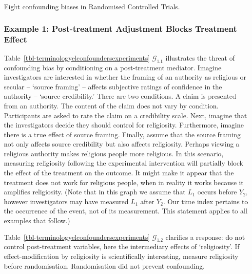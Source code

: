 \documentclass[
  single column]{article}
\begin{document}
\begin{table}

\caption{\label{tbl-terminologyelconfoundersexperiments}Eight
confounding biases in Randomised Controlled Trials.}

\centering{

\terminologyelconfoundersexperiments

}

\end{table}%

\subsubsection{Example 1: Post-treatment Adjustment Blocks Treatment
Effect}\label{example-1-post-treatment-adjustment-blocks-treatment-effect}

Table~\ref{tbl-terminologyelconfoundersexperiments}
\(\mathcal{G}_{1.1}\) illustrates the threat of confounding bias by
conditioning on a post-treatment mediator. Imagine investigators are
interested in whether the framing of an authority as religious or
secular -- `source framing' -- affects subjective ratings of confidence
in the authority -- `source credibility.' There are two conditions. A
claim is presented from an authority. The content of the claim does not
vary by condition. Participants are asked to rate the claim on a
credibility scale. Next, imagine that the investigators decide they
should control for religiosity. Furthermore, imagine there is a true
effect of source framing. Finally, assume that the source framing not
only affects source credibility but also affects religiosity. Perhaps
viewing a religious authority makes religious people more religious. In
this scenario, measuring religiosity following the experimental
intervention will partially block the effect of the treatment on the
outcome. It might make it appear that the treatment does not work for
religious people, when in reality it works because it amplifies
religiosity. (Note that in this graph we assume that \(L_1\) occurs
before \(Y_2\), however investigators may have measured \(L_1\) after
\(Y_2\). Our time index pertains to the occurrence of the event, not of
its measurement. This statement applies to all examples that follow.)

Table~\ref{tbl-terminologyelconfoundersexperiments}
\(\mathcal{G}_{1.2}\) clarifies a response: do not control
post-treatment variables, here the intermediary effects of
`religiosity'. If effect-modification by religiosity is scientifically
interesting, measure religiosity before randomisation. Randomisation did
not prevent confounding.
\end{document}

